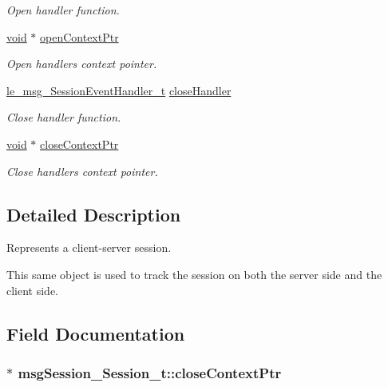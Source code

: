 \begin{DoxyCompactItemize}
\begin{DoxyCompactList}\small\item\em Open handler function. \end{DoxyCompactList}\item 
\hyperlink{_t_e_m_p_l_a_t_e__cdef_8h_ac9c84fa68bbad002983e35ce3663c686}{void} $\ast$ \hyperlink{structmsg_session___session__t_ab0a8a1498d475837e60f20340db2e8ac}{open\+Context\+Ptr}
\begin{DoxyCompactList}\small\item\em Open handler\textquotesingle{}s context pointer. \end{DoxyCompactList}\item 
\hyperlink{le__messaging_8h_a2db32a8ef90eced02789aee366c9dda2}{le\+\_\+msg\+\_\+\+Session\+Event\+Handler\+\_\+t} \hyperlink{structmsg_session___session__t_a94a31de9a03539c7f3b0843e94b8a9a0}{close\+Handler}
\begin{DoxyCompactList}\small\item\em Close handler function. \end{DoxyCompactList}\item 
\hyperlink{_t_e_m_p_l_a_t_e__cdef_8h_ac9c84fa68bbad002983e35ce3663c686}{void} $\ast$ \hyperlink{structmsg_session___session__t_a2610c902d9d301cef20edd74328d9d2c}{close\+Context\+Ptr}
\begin{DoxyCompactList}\small\item\em Close handler\textquotesingle{}s context pointer. \end{DoxyCompactList}\end{DoxyCompactItemize}


\subsection{Detailed Description}
Represents a client-\/server session.

This same object is used to track the session on both the server side and the client side. 

\subsection{Field Documentation}
\subsubsection[{\texorpdfstring{close\+Context\+Ptr}{closeContextPtr}}]{$\ast$ msg\+Session\+\_\+\+Session\+\_\+t\+::close\+Context\+Ptr}\hypertarget{structmsg_session___session__t_a2610c902d9d301cef20edd74328d9d2c}{}\label{structmsg_session___session__t_a2610c902d9d301cef20edd74328d9d2c}



